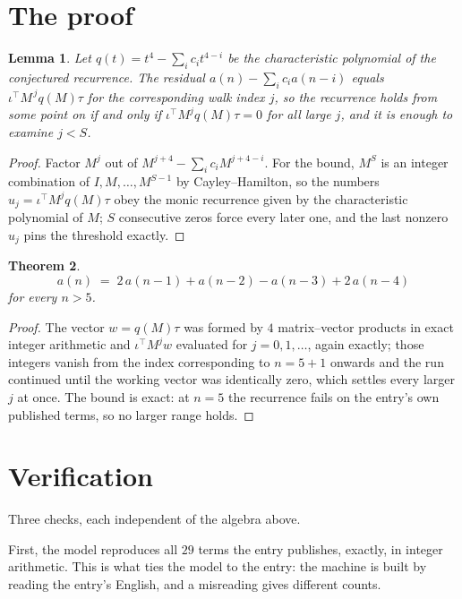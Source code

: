 \documentclass[11pt,a4paper]{article}
\theoremstyle{plain}
\newtheorem{theorem}{Theorem}
\newtheorem{lemma}[theorem]{Lemma}
\theoremstyle{definition}
\begin{document}
\section{The proof}

\begin{lemma}\label{lem:crit}
Let $q(t)=t^{4}-\sum_i c_it^{4-i}$ be the characteristic polynomial of the
conjectured recurrence. The residual $a(n)-\sum_ic_ia(n-i)$ equals
$\iota^{\!\top}M^{\,j}q(M)\tau$ for the corresponding walk index $j$, so the recurrence
holds from some point on if and only if $\iota^{\!\top}M^{j}q(M)\tau=0$ for all large $j$,
and it is enough to examine $j<S$.
\end{lemma}

\begin{proof}
Factor $M^{j}$ out of $M^{j+4}-\sum_ic_iM^{j+4-i}$. For the bound, $M^{S}$
is an integer combination of $I,M,\dots,M^{S-1}$ by Cayley--Hamilton, so the numbers
$u_j=\iota^{\!\top}M^{j}q(M)\tau$ obey the monic recurrence given by the characteristic
polynomial of $M$; $S$ consecutive zeros force every later one, and the last nonzero $u_j$
pins the threshold exactly.
\end{proof}

\begin{theorem}
\[
a(n)\;=\;2\,a(n-1) + a(n-2) - a(n-3) + 2\,a(n-4)
\]
for every $n>5$.
\end{theorem}

\begin{proof}
The vector $w=q(M)\tau$ was formed by $4$ matrix--vector products in exact integer
arithmetic and $\iota^{\!\top}M^{j}w$ evaluated for $j=0,1,\dots$, again exactly; those
integers vanish from the index corresponding to $n=5+1$ onwards and the run continued
until the working vector was identically zero, which settles every larger $j$ at once. The bound is exact: at $n=5$ the recurrence fails on the entry's own published terms, so no larger range holds.
\end{proof}

\section{Verification}

Three checks, each independent of the algebra above.

First, the model reproduces all $29$ terms the entry publishes, exactly, in integer
arithmetic. This is what ties the model to the entry: the machine is built by reading the
entry's English, and a misreading gives different counts.
\end{document}
